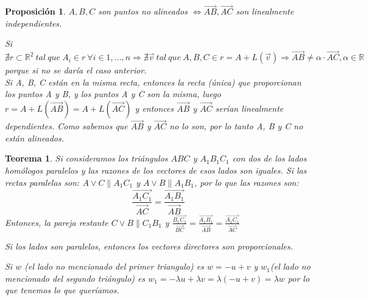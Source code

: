 \documentclass[11pt, a4paper, titlepage]{article}
\makeatletter
\renewenvironment{proof}[1][\proofname] {\vspace{-15pt}\par\pushQED{\qed}\normalfont\topsep6\p@\@plus6\p@\relax\trivlist\item[\hskip\labelsep\it#1\@addpunct{.}]\ignorespaces}{\popQED\endtrivlist\@endpefalse}
\theoremstyle{theorem-style}
\newtheorem*{nth}{Teorema}
\newtheorem*{nprop}{Proposición}
\theoremstyle{definition-style}
\theoremstyle{remark-style}
\theoremstyle{example-style}
\makeatother
\begin{document}
\begin{nprop}
$A,B,C$ son puntos no alineados  $ \iff \vec{AB},\vec{AC}$ son linealmente independientes.
	\begin {proof}

	\boxed{\Rightarrow}
		Si $\nexists r \subset \mathbb{R}^2\ tal\ que\ A_i \in r\ \forall i \in 1,...,n \Rightarrow \nexists \vec{v}\ tal\ que\ A,B,C \in r = A + L(\vec{v}) \Rightarrow \vec{AB} \neq \alpha \cdot \vec{AC}, \alpha \in \mathbb{R}\ $ porque si no se daría el caso anterior. \\
	\boxed{\Leftarrow} Si A, B, C están en la misma recta, entonces la recta (única) que proporcionan los puntos A y B, y los puntos A y C son la misma, luego $r = A + L(\vec{AB})  = A + L(\vec{AC})$ y entonces $\vec{AB}$ y $\vec{AC}$ serían linealmente dependientes. Como sabemos que $\vec{AB}$ y $\vec{AC}$ no lo son, por lo tanto A, B y C no están alineados.
	\end {proof}

\end{nprop}




\begin{nth}
	Si consideramos los triángulos $ABC$ y $A_1B_1C_1$ con dos de los lados homólogos paralelos y las razones de los vectores de esos lados son iguales.
	Si las rectas paralelas son: $A\vee C \parallel A_1C_1$ y $A\vee B \parallel A_1B_1$, por lo que las razones son:
	\[
	\frac{\vec{A_1C_1}}{\vec{AC}} = \frac{\vec{A_1B_1}}{\vec{AB}}
	\]
	Entonces, la pareja restante $C\vee B \parallel C_1B_1$ y $\frac{\vec{B_1C_1}}{\vec{BC}} = \frac{\vec{A_1B_1}}{\vec{AB}} = \frac{\vec{A_1C_1}}{\vec{AC}}$\\
	\begin{proof}
	Si los lados son paralelos, entonces los vectores directores son proporcionales.

	Si $w$ (el lado no mencionado del primer triangulo) es $w=-u+v$ y $w_1$(el lado no mencionado del segundo triángulo) es $w_1 = - \lambda u + \lambda v = \lambda (-u+v) = \lambda w$  por lo que tenemos lo que queríamos.
\end{proof}
\end{nth}
\end{document}
